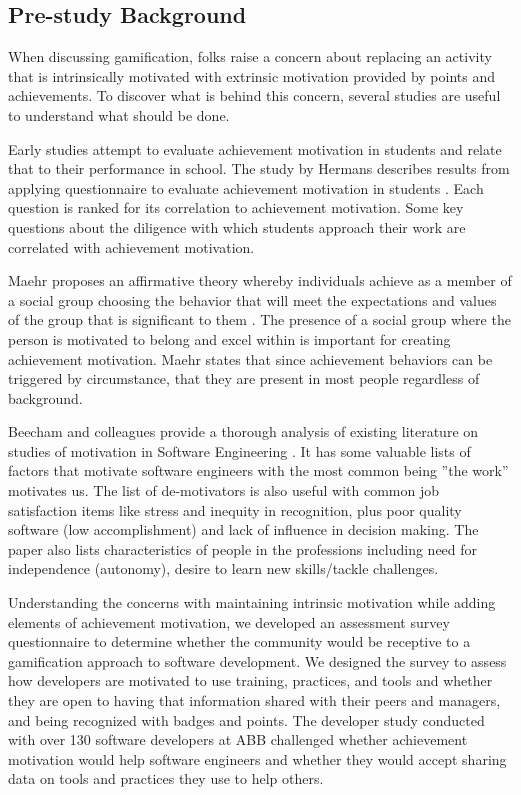 \documentclass{sig-alternate}
\begin{document}
\subsection{Pre-study Background}
When discussing gamification, folks raise a concern about replacing an activity that is intrinsically motivated with extrinsic motivation provided by points and achievements.  To discover what is behind this concern, several studies are useful to understand what should be done. 

Early studies attempt to evaluate achievement motivation in students and relate that to their performance in school.  The study by Hermans describes results from applying questionnaire to evaluate achievement motivation in students \cite{wbsnipes:Hermans1970Questionnaire}.  Each question is ranked for its correlation to achievement motivation. Some key questions about the diligence with which students approach their work are correlated with achievement motivation.  

Maehr proposes an affirmative theory whereby  individuals achieve as a member of a social group choosing the behavior that will meet the expectations and values of the group that is significant to them \cite{wbsnipes:MaehrCulture}.  The presence of a social group where the person is motivated to belong and excel within is important for creating achievement motivation.  Maehr states that since achievement behaviors can be triggered by circumstance, that they are present in most people regardless of background. 

Beecham and colleagues provide a thorough analysis of existing literature on studies of motivation in Software Engineering \cite{wbsnipes:Beecham2008Motivation}. It has some valuable lists of factors that motivate software engineers with the most common being ''the work'' motivates us. The list of de-motivators is also useful with common job satisfaction items like stress and inequity in recognition, plus poor quality software (low accomplishment) and lack of influence in decision making. The paper also lists characteristics of people in the professions including need for independence (autonomy), desire to learn new skills/tackle challenges. 

Understanding the concerns with maintaining intrinsic motivation while adding elements of achievement motivation, we developed an assessment survey questionnaire to determine whether the community would be receptive to a gamification approach to software development.   We designed  the survey to assess how developers are motivated to use training, practices, and tools and whether they are open to having that information shared with their peers and managers, and being recognized with badges and points. The developer study conducted with over 130 software developers at ABB challenged whether achievement motivation would help software engineers and whether they would accept sharing data on tools and practices they use to help others.
\end{document}
